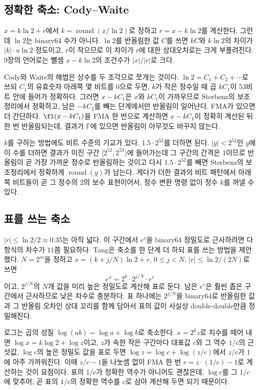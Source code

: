 \subsection{정확한 축소: Cody--Waite}

$x=k\ln2+r$에서 $k=\operatorname{round}(x/\ln2)$로 정하고 $r=x-k\ln2$를 계산한다. 그런데 $\ln2$는 binary64 수가 아니다. $\ln2$를 반올림한 값 $C$를 쓰면 $kC$와 $k\ln2$의 차이가 $|k|\cdot u\ln2$ 정도이고, $r$이 작으므로 이 차이가 $r$에 대한 상대오차로는 크게 부풀려진다. 9장의 언어로는 뺄셈 $x-k\ln2$의 조건수가 $|x|/|r|$로 크다.

Cody와 Waite의 해법은 상수를 두 조각으로 쪼개는 것이다\cite{cody1980software}. $\ln2=C_1+C_2+\cdots$로 쓰되 $C_1$의 유효숫자 아래쪽 몇 비트를 $0$으로 두면, $k$가 작은 정수일 때 곱 $kC_1$이 $53$비트 안에 들어가 정확하다. 그러면 $x-kC_1$은 $x$와 $kC_1$이 가까우므로 Sterbenz의 보조정리에서 정확하고, 남은 $-kC_2$를 빼는 단계에서만 반올림이 일어난다. FMA가 있으면 더 간단하다. $\fl(x-kC_1)$을 FMA 한 번으로 계산하면 $x-kC_1$이 정확히 계산된 뒤 한 번 반올림되는데, 결과가 $\mathbb F$에 있으면 반올림이 아무것도 바꾸지 않는다.

$k$를 구하는 방법에도 비트 수준의 기교가 있다. $1.5\cdot2^{52}$를 더하면 된다. $|y|<2^{51}$인 $y$에 이 수를 더하면 결과가 이진 구간 $[2^{52},2^{53})$에 들어가는데 그 구간의 간격은 $1$이므로 반올림이 곧 가장 가까운 정수로 반올림하는 것이고 다시 $1.5\cdot2^{52}$를 빼면 Sterbenz의 보조정리에서 정확하게 $\operatorname{round}(y)$가 남는다. 게다가 더한 결과의 비트 패턴에서 아래쪽 비트들이 곧 그 정수의 2의 보수 표현이어서, 정수 변환 명령 없이 정수 $k$를 꺼낼 수 있다.

\subsection{표를 쓰는 축소}

$|r|\le\ln2/2\approx0.35$는 아직 넓다. 이 구간에서 $e^r$을 binary64 정밀도로 근사하려면 다항식의 차수가 $11$쯤 필요하다. Tang은 축소를 한 단계 더 하되 표를 쓰는 방법을 제안했다\cite{tang1989exp}. $N=2^m$을 정하고 $x=(k+j/N)\ln2+r$, $0\le j<N$, $|r|\le\ln2/(2N)$로 쓰면
\[
e^x=2^k\cdot2^{j/N}\cdot e^r
\]
이고, $2^{j/N}$의 $N$개 값을 미리 높은 정밀도로 계산해 표로 둔다. 남은 $e^r$은 훨씬 좁은 구간에서 근사하므로 낮은 차수로 충분하다. 표 하나에는 $2^{j/N}$을 binary64로 반올림한 값과 그 반올림 오차인 상대 꼬리를 함께 담아서 표의 값이 사실상 double-double만큼 정밀해진다.

로그는 곱의 성질 $\log(ab)=\log a+\log b$로 축소한다. $x=2^kz$로 지수를 떼어 내면 $\log x=k\log2+\log z$이고, $z$가 속한 작은 구간마다 대표값 $c$와 그 역수 $1/c$의 근삿값, $\log c$의 높은 정밀도 값을 표로 두면 $\log z=\log c+\log(z/c)$에서 $z/c$가 $1$에 아주 가까워진다. 이때 $z/c-1$을 나눗셈 없이 FMA 한 번 $r=z\cdot(1/c)-1$로 계산하는 것이 요점이다. 표의 $1/c$가 정확한 역수가 아니어도 괜찮은데, $\log c$를 그 $1/c$에 맞추어, 곧 표의 $1/c$의 정확한 역수를 $c$로 삼아 계산해 두면 되기 때문이다.

